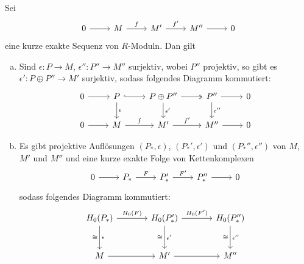 \begin{lemma}
	Sei 
	\[
		\begin{tikzcd}
			0 \rar & M \rar["f"] & M' \rar["f'"] & M'' \rar & 0
		\end{tikzcd}
	\]
	eine kurze exakte Sequenz von $R$-Moduln. Dan gilt
	\begin{enumerate}[a)]
		\item Sind $\epsilon \colon P \to M$, $\epsilon'' \colon P'' \to M''$ surjektiv, wobei $P''$ projektiv, so gibt es $\epsilon' \colon P \oplus P'' \to M'$ surjektiv, sodass folgendes Diagramm kommutiert:
		\[
			\begin{tikzcd}
				0 \rar & P \rar[hook] \dar["\epsilon"] & P \oplus P'' \rar[two heads] \dar["\epsilon'"] & P'' \rar  \dar["\epsilon''"] & 0 \\
				0 \rar & M \rar["f"] & M' \rar["f'"] & M'' \rar & 0
			\end{tikzcd}
		\]
		\item Es gibt projektive Auflösungen $(P_*,\epsilon)$, $(P_*',\epsilon')$ und $(P_*'',\epsilon'')$ von $M$, $M'$ und $M''$ und eine kurze exakte Folge von Kettenkomplexen
		\[
			\begin{tikzcd}
				0 \rar & P_* \rar["F"] & P_*' \rar["F'"] & P_*'' \rar & 0
			\end{tikzcd}
		\]
		sodass folgendes Diagramm kommutiert:
		\[
			\begin{tikzcd}[sep=large]
				H_0(P_*) \rar["H_0(F)"] \dar["\epsilon","\cong"'] & H_0(P_*') \dar["\epsilon'","\cong"'] \rar["H_0(F')"] & H_0(P_*'') \dar["\epsilon''","\cong"'] \\
				M \rar & M' \rar & M''
			\end{tikzcd}
		\]
	\end{enumerate}
\end{lemma}
